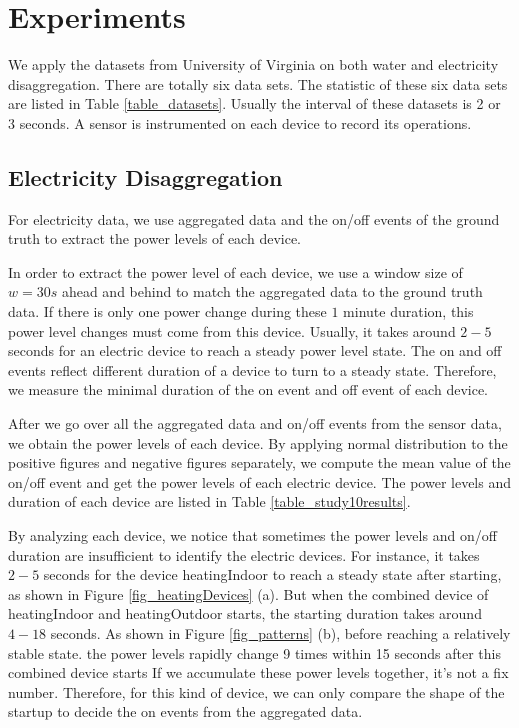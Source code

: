 \section{Experiments}
We apply the datasets from University of Virginia on both water and electricity disaggregation. 
There are totally six data sets. The statistic of these six data sets are listed in Table \ref{table_datasets}. 
Usually the interval of these datasets is 2 or 3 seconds. 
A sensor is instrumented on each device to record its operations. 


\subsection{Electricity Disaggregation}
For electricity data, we use aggregated data and the on/off events of the 
ground truth to extract the power levels of each device. 

In order to extract the power level of each device, 
we use a window size of $w=30s$ ahead and behind to match 
the aggregated data to the ground truth data.
If there is only one power change during these $1$ minute duration, 
this power level changes must come from this device. 
Usually, it takes around $2-5$ seconds for an electric device to reach
a steady power level  state. 
The on and off events reflect different duration of a device to 
turn to a steady state. 
Therefore, we measure the minimal duration of the on event and off event 
of each device. 

After we go over all the aggregated data and on/off events from the sensor data, 
we obtain the power levels of each device. 
By applying normal distribution to the positive figures and negative figures 
separately, we compute the mean value of the on/off event and
get the power levels of each electric device. 
The power levels and duration of each device are listed in Table \ref{table_study10results}.

By analyzing each device, we notice that sometimes the power levels and 
on/off duration are insufficient to identify the electric devices. 
For instance, it takes $2-5$ seconds for the device heatingIndoor to reach a steady state after starting,
as shown in Figure \ref{fig_heatingDevices} (a).
But when the combined device of heatingIndoor and heatingOutdoor 
starts, the starting duration takes around $4-18$ seconds. 
As shown in Figure \ref{fig_patterns} (b), before reaching a relatively stable state. 
the power levels rapidly change 9 times within 15 seconds after this combined device starts
If we accumulate these power levels together, it's not a fix number. Therefore, for this kind of device, 
we can only compare the shape of the startup to decide the on events 
from the aggregated data. 
%

